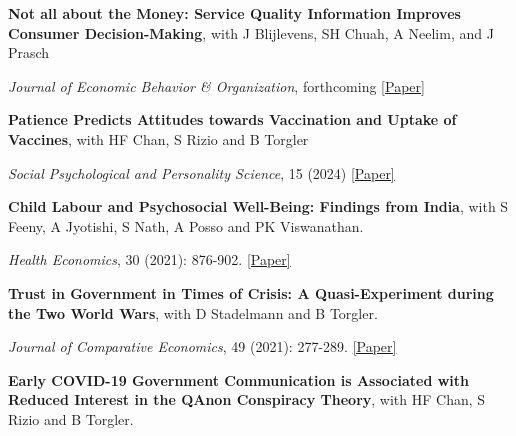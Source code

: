 \documentclass[letterpaper]{article}
\renewenvironment{itemize}{
  \begin{list}{}{
    \setlength{\leftmargin}{1.5em}
  }
}{
  \end{list}
}
\begin{document}
\begin{itemize}

\item \textbf{Not all about the Money: Service Quality Information Improves Consumer Decision-Making}, with J Blijlevens, SH Chuah, A Neelim, and J Prasch
			\vspace{-0.05in}
\item \textit{Journal of Economic Behavior \& Organization}, forthcoming \href{https://ahmedskali.com/papers/ServiceQuality.pdf}{[Paper]}


\medskip

			\item {\bf Patience Predicts Attitudes towards Vaccination and Uptake of Vaccines}, with HF Chan, S Rizio and B Torgler
 			\vspace{-0.05in}
	\item \textit{Social Psychological and Personality Science}, 15 (2024) \href{https://journals.sagepub.com/doi/full/10.1177/19485506231189905/}{[Paper]}

\medskip
	
			\item \textbf{Child Labour and Psychosocial Well-Being: Findings from India}, with S Feeny, A Jyotishi, S Nath, A Posso and PK Viswanathan. 

	\vspace{-0.05in}
	
		\item \textit{Health Economics}, 30 (2021): 876-902. \href{https://drive.google.com/file/d/1I9yWtV-pGuyV0i0fq94jGkzt6pMkHtGl/view?usp=sharing}{[Paper]}
	
	\medskip
	
			\item {\bf Trust in Government in Times of Crisis:
		A Quasi-Experiment during the Two World Wars}, with  D Stadelmann and B Torgler. 
	
	\vspace{-0.05in}

		\item \textit{Journal of Comparative Economics}, 49 (2021): 277-289.  \href{http://www.crema-research.ch/papers/2019-04.pdf}{[Paper]} 

\medskip

	\item \textbf{Early COVID-19 Government Communication is Associated with Reduced Interest in the QAnon Conspiracy Theory}, with HF Chan, S Rizio and B Torgler.
		\vspace{-0.05in}


\end{itemize}
\end{document}
